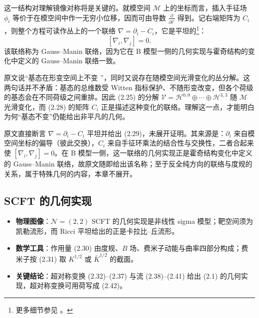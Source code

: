 这一结构对理解镜像对称将是关键的。就模空间 $\mathcal{M}$ 上的坐标而言，插入手征场 $\phi_{i}$ 等价于在模空间中作一无穷小位移，因而可由导数 $\frac{\partial}{\partial t^{i}}$ 得到。记右端矩阵为 $C_{i}$，则整个方程可读作丛上的一个联络 $\nabla=\partial_{i}-C_{i}$，它是平坦的\footnote{更多细节参见 \cite{ref19,ref9,ref34}。}：
\begin{equation}\tag{2.29}
[\nabla_{i},\nabla_{j}]=0.
\end{equation}
该联络称为 Gauss--Manin 联络，因为它在 B 模型一侧的几何实现与霍奇结构的变化中定义的 Gauss--Manin 联络一致。

\begin{yizhu}[物理图像]
原文说“基态在形变空间上不变 \cite{ref9}”，同时又说存在随模空间光滑变化的丛分解。这两句话并不矛盾：基态的总维数受 Witten 指标保护、不随形变改变，但各个荷级的基态会在不同荷级之间重排。因此 (2.25) 的分解 $\mathcal{V}=\mathcal{H}^{0,0}\oplus\cdots\oplus\mathcal{H}^{3,3}$ 随 $\mathcal{M}$ 光滑变化，而 (2.28) 的矩阵 $C_{i}$ 正是描述这种变化的联络。理解这一点，才能明白为何“基态不变”仍能给出非平凡的几何。
\end{yizhu}

\begin{yizhu}[含糊点]
原文直接断言 $\nabla=\partial_{i}-C_{i}$ 平坦并给出 (2.29)，未展开证明。其来源是：$\partial_{i}$ 来自模空间坐标的偏导（彼此交换），$C_{i}$ 来自手征环乘法的结合性与交换性，二者合起来使 $[\nabla_{i},\nabla_{j}]=0$。在 B 模型一侧，这一联络的几何实现正是霍奇结构变化中定义的 Gauss--Manin 联络，故原文随即给出该名称；至于反全纯方向的联络与度规的关系，属于特殊几何的内容，本章不展开。
\end{yizhu}

\subsection{SCFT 的几何实现}
\label{sec:2.5}

\begin{keytakeaways}
  \begin{itemize}[leftmargin=1.4em,itemsep=2pt,topsep=2pt]
    \item \textbf{物理图像}：$\mathcal{N}=(2,2)$ SCFT 的几何实现是非线性 sigma 模型；靶空间须为凯勒流形，而 Ricci 平坦给出的正是卡拉比--丘流形。
    \item \textbf{数学工具}：作用量 (2.30) 由度规、$B$ 场、费米子动能与曲率四部分构成；费米子按 (2.31) 取 $K^{1/2}$ 或 $\bar K^{1/2}$ 的截面。
    \item \textbf{关键结论}：超对称变换 (2.32)--(2.37) 与流 (2.38)--(2.41) 给出 (2.1) 的几何实现，超对称变换可用荷写成 (2.42)。
  \end{itemize}
\end{keytakeaways}

